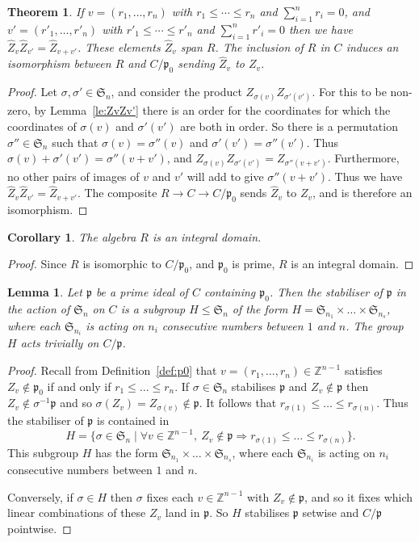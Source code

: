 \documentclass[12pt]{amsart}
\renewcommand{\le}{\leqslant}
\newcommand{\sym}[1]{\mathfrak{S}_{#1}}
\newcommand{\bZ}{{\mathbb{Z}}}
\newcommand{\mfp}{\mathfrak{p}}
\numberwithin{equation}{section}
\newtheorem{theorem}[equation]{Theorem}
\newtheorem{lemma}[equation]{Lemma}
\newtheorem{corollary}[equation]{Corollary}
\theoremstyle{definition}
\begin{document}
\begin{theorem}\label{th:Zvhat}
If $v=(r_1,\dots,r_n)$ with $r_1\le \cdots \le r_n$ and
$\sum_{i=1}^nr_i=0$, and
$v'=(r'_1,\dots,r'_n)$ with $r'_1\le \cdots \le r'_n$ and $\sum_{i=1}^nr'_i=0$ then we
have $\hat Z_v\hat Z_{v'}=\hat Z_{v+v'}$.
These elements $\hat Z_v$ span
$R$. The inclusion of $R$ in $C$ induces an
isomorphism between $R$ and $C/\mfp_0$ sending $\hat Z_v$ to $Z_v$.
\end{theorem}
\begin{proof}
Let $\sigma,\sigma'\in\sym{n}$, and consider the product
$Z_{\sigma(v)}Z_{\sigma'(v')}$. For this to be non-zero, by Lemma~\ref{le:ZvZv'}
there is an order for the coordinates for which the coordinates of
$\sigma(v)$ and $\sigma'(v')$ are both in order. So there is a
permutation $\sigma''\in\sym{n}$ such that $\sigma(v)=\sigma''(v)$ and
$\sigma'(v')=\sigma''(v')$. Thus
$\sigma(v)+\sigma'(v')=\sigma''(v+v')$, and
$Z_{\sigma(v)}Z_{\sigma'(v')}=Z_{\sigma''(v+v')}$. Furthermore, no
other pairs of images of $v$ and $v'$ will add to give
$\sigma''(v+v')$. Thus we have $\hat Z_v\hat Z_{v'}=\hat Z_{v+v'}$.
The composite $R\to C \to C/\mfp_0$ sends $\hat Z_v$ to $Z_v$,
and is therefore an isomorphism.
\end{proof}

\begin{corollary}\label{co:domain}
The algebra $R$ is an integral domain.
\end{corollary}
\begin{proof}
Since $R$ is isomorphic to $C/\mfp_0$, and $\mfp_0$ is prime,  $R$  is an integral
domain. 
\end{proof}


\begin{lemma}\label{le:stab(p)}
Let $\mfp$ be a prime ideal of $C$ containing $\mfp_0$. Then the stabiliser of $\mfp$ in
the action of $\sym{n}$ on $C$ is a subgroup $H\le \sym{n}$ of the form
$H=\sym{n_1}\times\dots\times\sym{n_s}$, where each
$\sym{n_i}$ is acting on $n_i$ consecutive numbers between $1$ and
$n$. The group $H$ acts trivially on $C/\mfp$.
\end{lemma}
\begin{proof}
Recall from Definition~\ref{def:p0} that $v=(r_1,\dots,r_n)\in\bZ^{n-1}$ satisfies
$Z_v\not\in\mfp_0$ if and only if $r_1\le\dots\le r_n$. If
$\sigma\in\sym{n}$ stabilises $\mfp$ and $Z_v\not\in\mfp$ then
$Z_v\not\in\sigma^{-1}\mfp$ and so
$\sigma(Z_v)=Z_{\sigma(v)}\not\in\mfp$. It follows that
$r_{\sigma(1)}\le\dots\le r_{\sigma(n)}$. Thus the stabiliser of
$\mfp$ is contained in
\[ H=\{\sigma\in \sym{n}\mid\forall v\in\bZ^{n-1},\ Z_v\not\in\mfp\Rightarrow
  r_{\sigma(1)}\le\dots\le r_{\sigma(n)}\}. \]
This subgroup $H$ has the form $\sym{n_1}\times\dots\times\sym{n_s}$,
where each $\sym{n_i}$ is acting on $n_i$ consecutive numbers between
$1$ and $n$.

Conversely, if $\sigma\in H$ then $\sigma$ fixes each $v\in\bZ^{n-1}$
with $Z_v\not\in\mfp$, and so it fixes which linear combinations of
these $Z_v$ land
in $\mfp$. So $H$ stabilises $\mfp$ setwise and $C/\mfp$ pointwise.
\end{proof}
\end{document}
